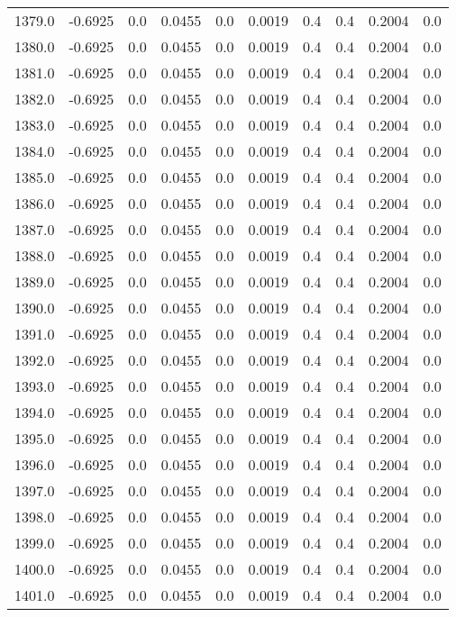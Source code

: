 \begin{longtable}{lrrrrrrrrr}
1379.0 & -0.6925 & 0.0 & 0.0455 & 0.0 & 0.0019 & 0.4 & 0.4 & 0.2004 & 0.0 \\
1380.0 & -0.6925 & 0.0 & 0.0455 & 0.0 & 0.0019 & 0.4 & 0.4 & 0.2004 & 0.0 \\
1381.0 & -0.6925 & 0.0 & 0.0455 & 0.0 & 0.0019 & 0.4 & 0.4 & 0.2004 & 0.0 \\
1382.0 & -0.6925 & 0.0 & 0.0455 & 0.0 & 0.0019 & 0.4 & 0.4 & 0.2004 & 0.0 \\
1383.0 & -0.6925 & 0.0 & 0.0455 & 0.0 & 0.0019 & 0.4 & 0.4 & 0.2004 & 0.0 \\
1384.0 & -0.6925 & 0.0 & 0.0455 & 0.0 & 0.0019 & 0.4 & 0.4 & 0.2004 & 0.0 \\
1385.0 & -0.6925 & 0.0 & 0.0455 & 0.0 & 0.0019 & 0.4 & 0.4 & 0.2004 & 0.0 \\
1386.0 & -0.6925 & 0.0 & 0.0455 & 0.0 & 0.0019 & 0.4 & 0.4 & 0.2004 & 0.0 \\
1387.0 & -0.6925 & 0.0 & 0.0455 & 0.0 & 0.0019 & 0.4 & 0.4 & 0.2004 & 0.0 \\
1388.0 & -0.6925 & 0.0 & 0.0455 & 0.0 & 0.0019 & 0.4 & 0.4 & 0.2004 & 0.0 \\
1389.0 & -0.6925 & 0.0 & 0.0455 & 0.0 & 0.0019 & 0.4 & 0.4 & 0.2004 & 0.0 \\
1390.0 & -0.6925 & 0.0 & 0.0455 & 0.0 & 0.0019 & 0.4 & 0.4 & 0.2004 & 0.0 \\
1391.0 & -0.6925 & 0.0 & 0.0455 & 0.0 & 0.0019 & 0.4 & 0.4 & 0.2004 & 0.0 \\
1392.0 & -0.6925 & 0.0 & 0.0455 & 0.0 & 0.0019 & 0.4 & 0.4 & 0.2004 & 0.0 \\
1393.0 & -0.6925 & 0.0 & 0.0455 & 0.0 & 0.0019 & 0.4 & 0.4 & 0.2004 & 0.0 \\
1394.0 & -0.6925 & 0.0 & 0.0455 & 0.0 & 0.0019 & 0.4 & 0.4 & 0.2004 & 0.0 \\
1395.0 & -0.6925 & 0.0 & 0.0455 & 0.0 & 0.0019 & 0.4 & 0.4 & 0.2004 & 0.0 \\
1396.0 & -0.6925 & 0.0 & 0.0455 & 0.0 & 0.0019 & 0.4 & 0.4 & 0.2004 & 0.0 \\
1397.0 & -0.6925 & 0.0 & 0.0455 & 0.0 & 0.0019 & 0.4 & 0.4 & 0.2004 & 0.0 \\
1398.0 & -0.6925 & 0.0 & 0.0455 & 0.0 & 0.0019 & 0.4 & 0.4 & 0.2004 & 0.0 \\
1399.0 & -0.6925 & 0.0 & 0.0455 & 0.0 & 0.0019 & 0.4 & 0.4 & 0.2004 & 0.0 \\
1400.0 & -0.6925 & 0.0 & 0.0455 & 0.0 & 0.0019 & 0.4 & 0.4 & 0.2004 & 0.0 \\
1401.0 & -0.6925 & 0.0 & 0.0455 & 0.0 & 0.0019 & 0.4 & 0.4 & 0.2004 & 0.0 \\

\end{longtable}
